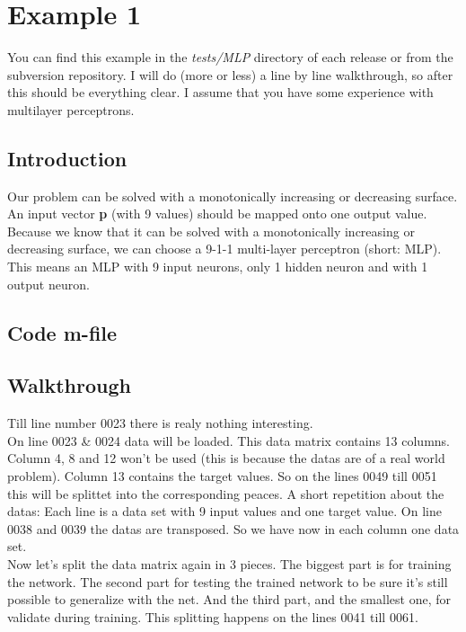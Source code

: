 \section{Example 1}
You can find this example in the \textit{tests/MLP} directory of each release or from the subversion repository. I will do (more or less) a line by line walkthrough, so after this should be everything clear. I assume that you have some experience with multilayer perceptrons.

\subsection{Introduction}
Our problem can be solved with a monotonically increasing or decreasing surface. An input vector \textbf{p} (with 9 values) should be mapped onto one output value. Because we know that it can be solved with a monotonically increasing or decreasing surface, we can choose a 9-1-1 multi-layer perceptron (short: MLP).
This means an MLP with 9 input neurons, only 1 hidden neuron and with 1 output neuron.

\subsection{Code m-file}


\subsection{Walkthrough}
Till line number 0023 there is realy nothing interesting.\\
On line 0023 \& 0024 data will be loaded. This data matrix contains 13 columns. Column 4, 8 and 12 won't be used (this is because the datas are of a real world problem). Column 13 contains the target values.
So on the lines 0049 till 0051 this will be splittet into the corresponding peaces. A short repetition about the datas: Each line is a data set with 9 input values and one target value. On line 0038 and 0039 the datas are transposed. So we have now in each column one data set.\\

Now let's split the data matrix again in 3 pieces. The biggest part is for training the network. The second part for testing the trained network to be sure it's still possible to generalize with the net. And the third part, and the smallest one, for validate during training. This splitting happens on the lines 0041 till 0061.\\

